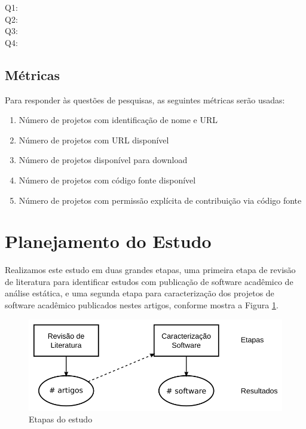 \begin{description}
  \item [Q1:] \EstudoUmQuestaoUm
  \item [Q2:] \EstudoUmQuestaoDois
  \item [Q3:] \EstudoUmQuestaoTres
  \item [Q4:] \EstudoUmQuestaoQuatro
\end{description}

\subsection{Métricas}

Para responder às questões de pesquisas, as seguintes métricas serão usadas:

\begin{enumerate}
  \item Número de projetos com identificação de nome e URL
  \item Número de projetos com URL disponível
  \item Número de projetos disponível para download
  \item Número de projetos com código fonte disponível
  \item Número de projetos com permissão explícita de contribuição via código fonte
\end{enumerate}


\section{Planejamento do Estudo} \label{estudo1:planejamento} %

Realizamos este estudo em duas grandes etapas, uma primeira etapa de revisão de
literatura para identificar estudos com publicação de software acadêmico de
análise estática, e uma segunda etapa para caracterização dos projetos de
software acadêmico publicados nestes artigos, conforme mostra a Figura
\ref{estudo1-etapas}.

\begin{figure}[h]
  \center
  \includegraphics[scale=0.4]{imagens/estudo1-etapas.png}
  \caption{Etapas do estudo}
  \label{estudo1-etapas}
\end{figure}

